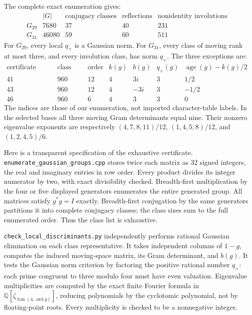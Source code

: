 The complete exact enumeration gives:
\[
\begin{array}{c|r|r|r|r}
&|G|&\text{conjugacy classes}&\text{reflections}&
 \text{nonidentity involutions}\\\hline
G_{29}&7680&37&40&231\\
G_{31}&46080&59&60&511
\end{array}
\]
For \(G_{29}\), every local \(q_+\) is a Gaussian norm. For
\(G_{31}\), every class of moving rank at most three, and every
involution class, has norm \(q_+\). The three exceptions are:
\[
\begin{array}{c|r|r|c|c|c|c}
\text{certificate index}&\text{class size}&\text{order}&k(g)&b(g)&q_+(g)
 &\operatorname{age}(g)-k(g)/2\\\hline
41&960&12&4&3i&3&1/2\\
43&960&12&4&-3i&3&-1/2\\
46&960&6&4&3&3&0
\end{array}
\]
The indices are those of our enumeration, not imported character-table
labels. In the selected bases all three moving Gram determinants equal
nine. Their nonzero eigenvalue exponents are respectively
\((4,7,8,11)/12\), \((1,4,5,8)/12\), and \((1,2,4,5)/6\).

Here is a transparent specification of the exhaustive certificate.
\texttt{enumerate\_gaussian\_groups.cpp} stores twice each matrix as
32 signed integers, the real and imaginary entries in row order. Every
product divides its integer numerator by two, with exact divisibility
checked. Breadth-first multiplication by the four or five displayed
generators enumerates the entire generated group. All matrices satisfy
\(g^*g=I\) exactly. Breadth-first conjugation by the same generators
partitions it into complete conjugacy classes; the class sizes sum to
the full enumerated order. Thus the class list is exhaustive.

\texttt{check\_local\_discriminants.py} independently performs rational
Gaussian elimination on each class representative. It takes independent
columns of \(1-g\), computes the induced moving-space matrix, its Gram
determinant, and \(b(g)\). It tests the Gaussian norm criterion by
factoring the positive rational number \(q_+\): each prime congruent
to three modulo four must have even valuation. Eigenvalue multiplicities
are computed by the exact finite Fourier formula in
\(\mathbb Q[\zeta_{\operatorname{lcm}(4,\operatorname{ord}g)}]\), reducing
polynomials by the cyclotomic polynomial, not by floating-point roots.
Every multiplicity is checked to be a nonnegative integer.

